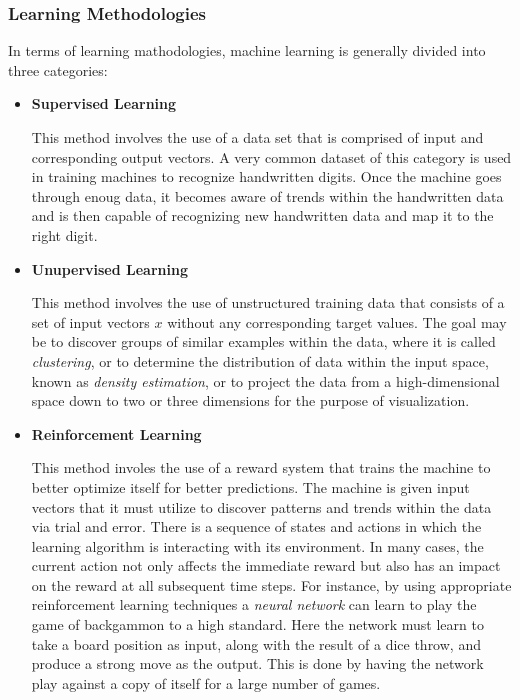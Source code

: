 \documentclass{article}
\begin{document}
	\subsubsection{Learning Methodologies}
	In terms of learning mathodologies, machine learning is generally divided into three categories: 
	\begin{itemize}
		\item \textbf{Supervised Learning}\par
		This method involves the use of a data set that is comprised of input and corresponding output vectors. A very common dataset of this category is used in training machines to recognize handwritten digits. Once the machine goes through enoug data, it becomes aware of trends within the handwritten data and is then capable of recognizing new handwritten data and map it to the right digit. \cite{BOOK:3} 
		\item \textbf{Unupervised Learning}\par
		This method involves the use of unstructured training data that consists of a set of input vectors $x$ without any corresponding target values. The goal may be to discover groups of similar examples within the data, where it is called \textit{clustering}, or to determine the distribution of data within the input space, known as \textit{density estimation}, or to project the data from a high-dimensional space down to two or three dimensions for the purpose of visualization.\cite{BOOK:3} 

		\item \textbf{Reinforcement Learning}\par
		This method involes the use of a reward system that trains the machine to better optimize itself for better predictions. The machine is given input vectors that it must utilize to discover patterns and trends within the data via trial and error. There is a sequence of states and actions in which the learning algorithm is interacting with its environment. In many cases, the current action not only affects the immediate reward but also has an impact on the reward at all subsequent time steps. For instance, by using appropriate reinforcement learning techniques a \textit{neural network} can learn to play the game of backgammon to a high standard. Here the network must learn to take a board position as input, along with the result of a dice throw, and produce a strong move as the output. This is done by having the network play against a copy of itself for a large number of games.\cite{BOOK:3} 
	\end{itemize}
	
\end{document}

